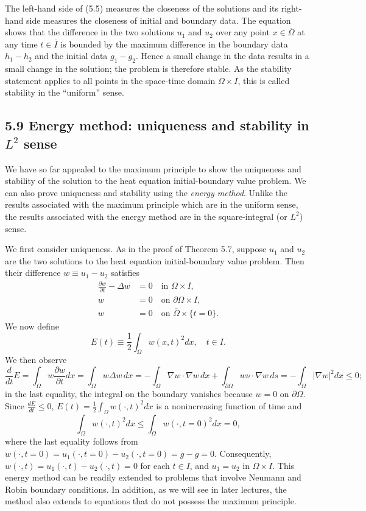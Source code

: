The left-hand side of (5.5) measures the closeness of the solutions and its right-hand side measures the closeness of initial and boundary data. The equation shows that the difference in the two solutions $u_1$ and $u_2$ over any point $x \in \overline{\Omega}$ at any time $t \in \overline{I}$ is bounded by the maximum difference in the boundary data $h_1 - h_2$ and the initial data $g_1 - g_2$. Hence a small change in the data results in a small change in the solution; the problem is therefore stable. As the stability statement applies to all points in the space-time domain $\Omega \times I$, this is called stability in the ``uniform'' sense.

\subsection{5.9 Energy method: uniqueness and stability in $L^2$ sense}
We have so far appealed to the maximum principle to show the uniqueness and stability of the solution to the heat equation initial-boundary value problem. We can also prove uniqueness and stability using the \textit{energy method}. Unlike the results associated with the maximum principle which are in the uniform sense, the results associated with the energy method are in the square-integral (or $L^2$) sense.

We first consider uniqueness. As in the proof of Theorem 5.7, suppose $u_1$ and $u_2$ are the two solutions to the heat equation initial-boundary value problem. Then their difference $w \equiv u_1 - u_2$ satisfies
\begin{align*}
    \frac{\partial w}{\partial t} - \Delta w &= 0 \quad \text{in } \Omega \times I, \\
    w &= 0 \quad \text{on } \partial\Omega \times I, \\
    w &= 0 \quad \text{on } \overline{\Omega} \times \{t = 0\}.
\end{align*}
We now define
\[E(t) \equiv \frac{1}{2} \int_\Omega w(x, t)^2 dx, \quad t \in I.\]
We then observe
\[\frac{d}{dt} E = \int_\Omega w \frac{\partial w}{\partial t} dx = \int_\Omega w \Delta w\,dx = -\int_\Omega \nabla w \cdot \nabla w\,dx + \int_{\partial\Omega} w \nu \cdot \nabla w\,ds = -\int_\Omega |\nabla w|^2 dx \leq 0;\]
in the last equality, the integral on the boundary vanishes because $w = 0$ on $\partial\Omega$. Since $\frac{dE}{dt} \leq 0$, $E(t) = \frac{1}{2} \int_\Omega w(\cdot, t)^2 dx$ is a nonincreasing function of time and
\begin{equation*}
    \int_\Omega w(\cdot, t)^2 dx \leq \int_\Omega w(\cdot, t = 0)^2 dx = 0, \tag{5.6}
\end{equation*}
where the last equality follows from $w(\cdot, t = 0) = u_1(\cdot, t = 0) - u_2(\cdot, t = 0) = g - g = 0$. Consequently, $w(\cdot, t) = u_1(\cdot, t) - u_2(\cdot, t) = 0$ for each $t \in I$, and $u_1 = u_2$ in $\Omega \times I$. This energy method can be readily extended to problems that involve Neumann and Robin boundary conditions. In addition, as we will see in later lectures, the method also extends to equations that do not possess the maximum principle.

